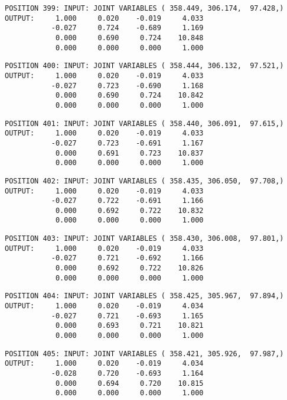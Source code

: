 \begin{verbatim}
POSITION 399: INPUT: JOINT VARIABLES ( 358.449, 306.174,  97.428,)
OUTPUT:     1.000     0.020    -0.019     4.033
           -0.027     0.724    -0.689     1.169
            0.000     0.690     0.724    10.848
            0.000     0.000     0.000     1.000
\end{verbatim} \pagebreak[1]\begin{verbatim}
POSITION 400: INPUT: JOINT VARIABLES ( 358.444, 306.132,  97.521,)
OUTPUT:     1.000     0.020    -0.019     4.033
           -0.027     0.723    -0.690     1.168
            0.000     0.690     0.724    10.842
            0.000     0.000     0.000     1.000
\end{verbatim} \pagebreak[1]\begin{verbatim}
POSITION 401: INPUT: JOINT VARIABLES ( 358.440, 306.091,  97.615,)
OUTPUT:     1.000     0.020    -0.019     4.033
           -0.027     0.723    -0.691     1.167
            0.000     0.691     0.723    10.837
            0.000     0.000     0.000     1.000
\end{verbatim} \pagebreak[1]\begin{verbatim}
POSITION 402: INPUT: JOINT VARIABLES ( 358.435, 306.050,  97.708,)
OUTPUT:     1.000     0.020    -0.019     4.033
           -0.027     0.722    -0.691     1.166
            0.000     0.692     0.722    10.832
            0.000     0.000     0.000     1.000
\end{verbatim} \pagebreak[1]\begin{verbatim}
POSITION 403: INPUT: JOINT VARIABLES ( 358.430, 306.008,  97.801,)
OUTPUT:     1.000     0.020    -0.019     4.033
           -0.027     0.721    -0.692     1.166
            0.000     0.692     0.722    10.826
            0.000     0.000     0.000     1.000
\end{verbatim} \pagebreak[1]\begin{verbatim}
POSITION 404: INPUT: JOINT VARIABLES ( 358.425, 305.967,  97.894,)
OUTPUT:     1.000     0.020    -0.019     4.034
           -0.027     0.721    -0.693     1.165
            0.000     0.693     0.721    10.821
            0.000     0.000     0.000     1.000
\end{verbatim} \pagebreak[1]\begin{verbatim}
POSITION 405: INPUT: JOINT VARIABLES ( 358.421, 305.926,  97.987,)
OUTPUT:     1.000     0.020    -0.019     4.034
           -0.028     0.720    -0.693     1.164
            0.000     0.694     0.720    10.815
            0.000     0.000     0.000     1.000
\end{verbatim} \pagebreak[1]\begin{verbatim}

\end{verbatim}
